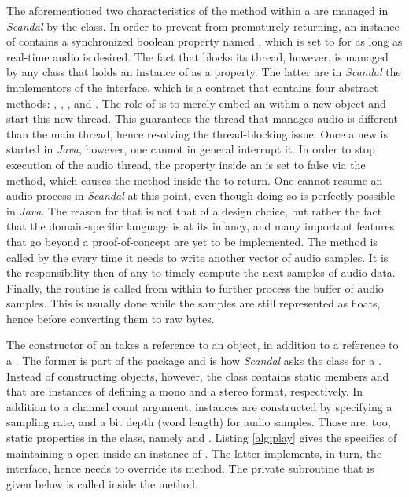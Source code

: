 The aforementioned two characteristics of the  method within a  are managed in \emph{Scandal} by the  class. In order to prevent  from prematurely returning, an instance of  contains a synchronized boolean property named , which is set to  for as long as real-time audio is desired. The fact that  blocks its thread, however, is managed by any class that holds an instance of  as a property. The latter are in \emph{Scandal} the implementors of the  interface, which is a contract that contains four abstract methods: , , , and . The role of  is to merely embed an  within a new  object and start this new thread. This guarantees the thread that manages audio is different than the main  thread, hence resolving the thread-blocking issue. Once a new  is started in \emph{Java}, however, one cannot in general interrupt it. In order to stop execution of the audio thread, the  property inside an  is set to false via the  method, which causes the  method inside the  to return. One cannot resume an audio process in \emph{Scandal} at this point, even though doing so is perfectly possible in \emph{Java}. The reason for that is not that of a design choice, but rather the fact that the domain-specific language is at its infancy, and many important features that go beyond a proof-of-concept are yet to be implemented. The  method is called by the  every time it needs to write another vector of audio samples. It is the responsibility then of any  to timely compute the next  samples of audio data. Finally, the  routine is called from within  to further process the buffer of audio samples. This is usually done while the samples are still represented as floats, hence before converting them to raw bytes.

The constructor of an  takes a reference to an  object, in addition to a reference to a . The former is part of the  package and is how \emph{Scandal} asks the  class for a . Instead of constructing  objects, however, the  class contains static members  and  that are instances of  defining a mono and a stereo format, respectively. In addition to a channel count argument,  instances are constructed by specifying a sampling rate, and a bit depth (word length) for audio samples. Those are, too, static properties in the  class, namely  and . Listing \ref{alg:play} gives the specifics of maintaining a  open inside an instance of . The latter implements, in turn, the  interface, hence needs to override its  method. The private  subroutine that is given below is called inside the  method.


